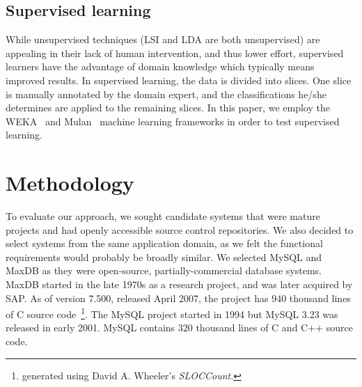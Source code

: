 \documentclass{acm_proc_article-sp}
\begin{document}
\subsection{Supervised learning}
While unsupervised techniques (LSI and LDA are both unsupervised) are appealing in their lack of human intervention, and thus lower effort, supervised learners have the advantage of domain knowledge which typically means improved results. In supervised learning, the data is divided into slices. One slice is manually annotated by the domain expert, and the classifications he/she determines are applied to the remaining slices. In this paper, we employ the WEKA~\cite{weka09} and Mulan~\cite{mulan} machine learning frameworks in order to test supervised learning.

 
\section{Methodology}

To evaluate our approach, we sought candidate systems that were
mature projects and had openly accessible source control repositories.
We also decided to select systems from the same application
domain, as we felt the functional requirements would probably be
broadly similar.
We selected MySQL and MaxDB as they were open-source, partially-commercial database systems. MaxDB started in the late 1970s as a research project, and was later acquired by SAP. As of version 7.500, released April 2007, the project has 940 thousand lines of C source code~\footnote{generated using David A. Wheeler's \emph{SLOCCount}.}.
The MySQL project started in 1994 but MySQL 3.23 was released in early 2001. MySQL contains 320 thousand lines of C and C++ source code. 
\end{document}
